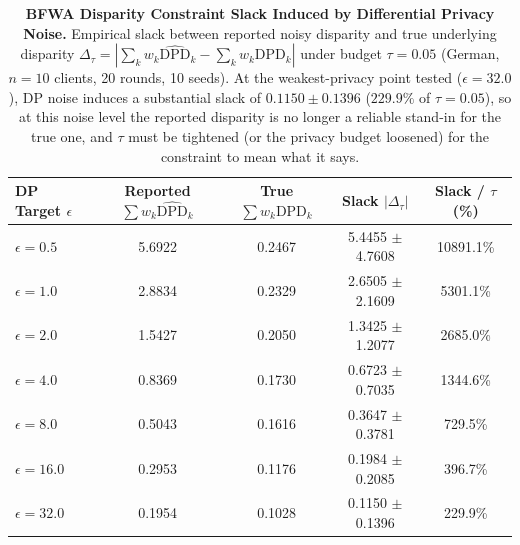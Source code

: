 \begin{table}[t]
\centering
\small
\caption{\textbf{BFWA Disparity Constraint Slack Induced by Differential Privacy Noise.}
Empirical slack between reported noisy disparity and true underlying disparity $\Delta_{\tau} = |\sum_k w_k \widehat{\text{DPD}}_k - \sum_k w_k \text{DPD}_k|$ under budget $\tau = 0.05$ (German, $n=10$ clients, 20 rounds, 10 seeds).
At the weakest-privacy point tested ($\epsilon = 32.0$), DP noise induces a substantial slack of $0.1150 \pm 0.1396$ ($229.9\%$ of $\tau = 0.05$), so at this noise level the reported disparity is no longer a reliable stand-in for the true one, and $\tau$ must be tightened (or the privacy budget loosened) for the constraint to mean what it says.}
\label{tab:bfwa_slack}
\begin{tabular}{lcccc}
\toprule
\textbf{DP Target $\epsilon$} & \textbf{Reported $\sum w_k \widehat{\text{DPD}}_k$} & \textbf{True $\sum w_k \text{DPD}_k$} & \textbf{Slack $|\Delta_{\tau}|$} & \textbf{Slack / $\tau$ (\%)} \\
\midrule
$\epsilon = 0.5$ & 5.6922 & 0.2467 & 5.4455 $\pm$ 4.7608 & 10891.1\% \\
$\epsilon = 1.0$ & 2.8834 & 0.2329 & 2.6505 $\pm$ 2.1609 & 5301.1\% \\
$\epsilon = 2.0$ & 1.5427 & 0.2050 & 1.3425 $\pm$ 1.2077 & 2685.0\% \\
$\epsilon = 4.0$ & 0.8369 & 0.1730 & 0.6723 $\pm$ 0.7035 & 1344.6\% \\
$\epsilon = 8.0$ & 0.5043 & 0.1616 & 0.3647 $\pm$ 0.3781 & 729.5\% \\
$\epsilon = 16.0$ & 0.2953 & 0.1176 & 0.1984 $\pm$ 0.2085 & 396.7\% \\
$\epsilon = 32.0$ & 0.1954 & 0.1028 & 0.1150 $\pm$ 0.1396 & 229.9\% \\
\bottomrule
\end{tabular}
\end{table}
